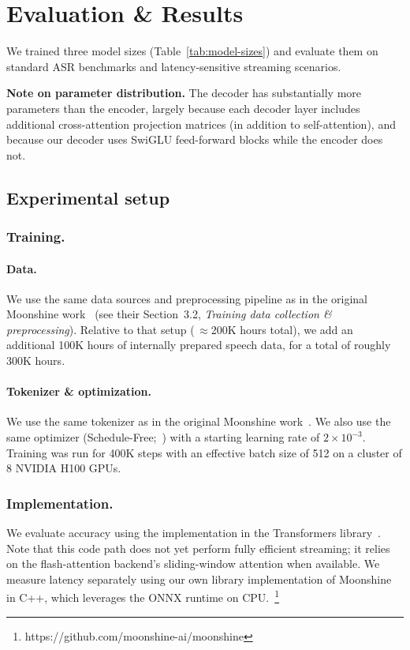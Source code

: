 \section{Evaluation \& Results}
\label{sec:evaluation}
We trained three model sizes (Table~\ref{tab:model-sizes}) and evaluate them on
standard ASR benchmarks and latency-sensitive streaming scenarios.



\noindent\textbf{Note on parameter distribution.} The decoder has substantially more parameters than the encoder, largely because each decoder layer includes additional cross-attention projection matrices (in addition to self-attention), and because our decoder uses SwiGLU feed-forward blocks while the encoder does not.

\subsection{Experimental setup}
\subsubsection{Training.}
\paragraph{Data.} We use the same data sources and preprocessing pipeline as in the original
Moonshine work~\citep{jeffries2024moonshinespeechrecognitionlive} (see their
Section~3.2, \emph{Training data collection \& preprocessing}). Relative to that
setup (\,$\approx$200K hours total), we add an additional 100K hours of
internally prepared speech data, for a total of roughly 300K hours.

\paragraph{Tokenizer \& optimization. }We use the same tokenizer as in the original Moonshine
work~\citep{jeffries2024moonshinespeechrecognitionlive}. We also use the same
optimizer (Schedule-Free;~\citep{defazio2024roadscheduled}) with a starting
learning rate of $2\times10^{-3}$. Training was run for 400K steps with an
effective batch size of 512 on a cluster of 8 NVIDIA H100 GPUs.

\subsubsection{Implementation.}
We evaluate accuracy using the implementation in the Transformers
library~\citep{wolf2020transformers}. Note that this code path does not yet
perform fully efficient streaming; it relies on the flash-attention backend's
sliding-window attention when available. We measure latency separately
using our own library implementation of Moonshine in C++, which leverages the ONNX
runtime on CPU.~\footnote{https://github.com/moonshine-ai/moonshine}


